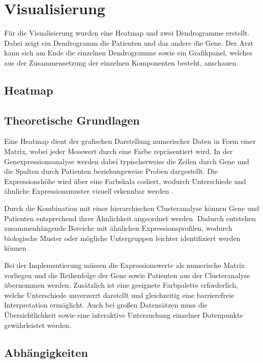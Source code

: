 \documentclass[12pt]{article}
\begin{document}
\newpage
\pagestyle{fancy}
\fancyhead{}
\section{Visualisierung}
\label{visualisierung}

Für die Visualisierung wurden eine Heatmap und zwei Dendrogramme erstellt. Dabei zeigt ein Dendrogramm die Patienten und das andere die Gene. Der Arzt kann sich am Ende die einzelnen Dendrogramme sowie ein Grafikpanel, welches aus der Zusammensetzung der einzelnen Komponenten besteht, anschauen.

\subsection{Heatmap}
\label{heatmap}

\subsection{Theoretische Grundlagen}

Eine Heatmap dient der grafischen Darstellung numerischer Daten in Form einer Matrix, wobei jeder Messwert durch eine Farbe repräsentiert wird. In der Genexpressionsanalyse werden dabei typischerweise die Zeilen durch Gene und die Spalten durch Patienten beziehungsweise Proben dargestellt. Die Expressionshöhe wird über eine Farbskala codiert, wodurch Unterschiede und ähnliche Expressionsmuster visuell erkennbar werden \cite{Gu2016}.

Durch die Kombination mit einer hierarchischen Clusteranalyse können Gene und Patienten entsprechend ihrer Ähnlichkeit angeordnet werden. Dadurch entstehen zusammenhängende Bereiche mit ähnlichen Expressionsprofilen, wodurch biologische Muster oder mögliche Untergruppen leichter identifiziert werden können \cite{Gu2016}. 

Bei der Implementierung müssen die Expressionswerte als numerische Matrix vorliegen und die Reihenfolge der Gene sowie Patienten aus der Clusteranalyse übernommen werden. Zusätzlich ist eine geeignete Farbpalette erforderlich, welche Unterschiede unverzerrt darstellt und gleichzeitig eine barrierefreie Interpretation ermöglicht. Auch bei großen Datensätzen muss die Übersichtlichkeit sowie eine interaktive Untersuchung einzelner Datenpunkte gewährleistet werden.

\subsection{Abhängigkeiten}
\end{document}
